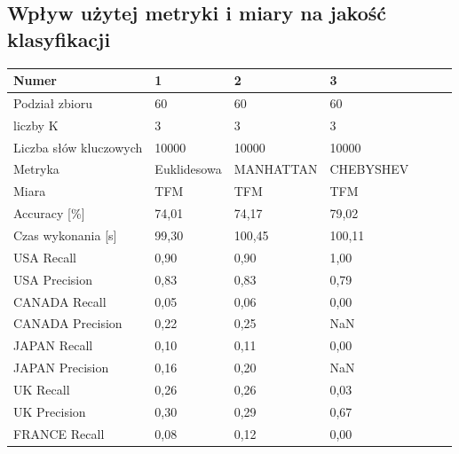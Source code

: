 \documentclass{classrep}
\begin{document}
{        \subsection{Wpływ użytej metryki i miary na jakość klasyfikacji} {
            \begin{table}[!htbp]
                \centering
                \begin{tabular}{|l|l|l|l|l|l|l|}
                    \hline
                    Numer                   & 1                 & 2           & 3            \\ \hline
                    Podział zbioru          & 60		        & 60		  & 60		     \\ \hline
                    liczby K                & 3			        & 3			  & 3			 \\ \hline
                    Liczba słów kluczowych  & 10000		        & 10000		  & 10000		 \\ \hline
                    Metryka                 & Euklidesowa	    & MANHATTAN	  & CHEBYSHEV	 \\ \hline
                    Miara                   & TFM		        & TFM		  & TFM		     \\ \hline
                    Accuracy {[}\%{]}       & 74,01		        & 74,17		  & 79,02		 \\ \hline
                    Czas wykonania {[}s{]}  & 99,30		        & 100,45	  & 100,11	     \\ \hline
                    USA Recall              & 0,90		        & 0,90		  & 1,00		 \\ \hline
                    USA Precision           & 0,83		        & 0,83		  & 0,79		 \\ \hline
                    CANADA Recall           & 0,05		        & 0,06		  & 0,00		 \\ \hline
                    CANADA Precision        & 0,22		        & 0,25		  & NaN			 \\ \hline
                    JAPAN Recall            & 0,10		        & 0,11		  & 0,00		 \\ \hline
                    JAPAN Precision         & 0,16		        & 0,20		  & NaN			 \\ \hline
                    UK Recall               & 0,26		        & 0,26		  & 0,03		 \\ \hline
                    UK Precision            & 0,30		        & 0,29		  & 0,67		 \\ \hline
                    FRANCE Recall           & 0,08		        & 0,12		  & 0,00		 \\ \hline

\end{tabular}
\end{table}}}
\end{document}
